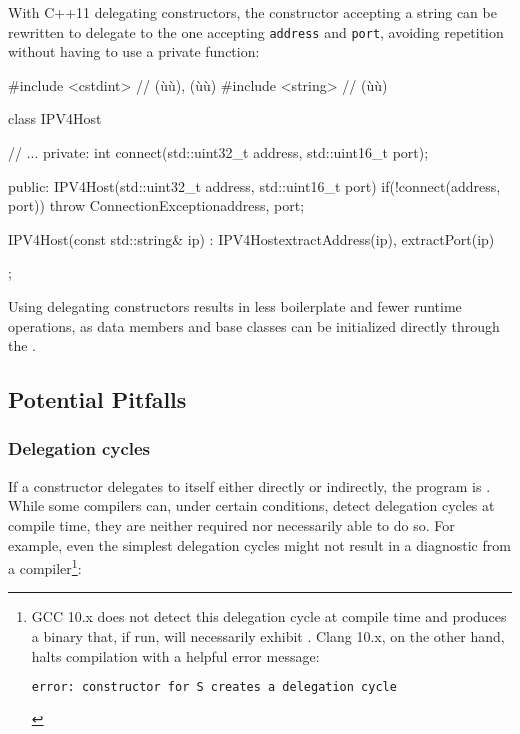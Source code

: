 \noindent With C++11 delegating constructors, the constructor accepting a string can be rewritten to
delegate to the one accepting \lstinline!address! and \lstinline!port!,
avoiding repetition without having to use a private function:

\begin{emcppslisting}[emcppsbatch=e3]
#include <cstdint>  // (ù{}ù), (ù{}ù)
#include <string>   // (ù{}ù)

class IPV4Host
{
     // ...
private:
    int connect(std::uint32_t address, std::uint16_t port);

public:
    IPV4Host(std::uint32_t address, std::uint16_t port)
    {
        if(!connect(address, port))
        {
            throw ConnectionException{address, port};
        }
    }

    IPV4Host(const std::string& ip)
        : IPV4Host{extractAddress(ip), extractPort(ip)}
    {
    }
};
\end{emcppslisting}

\noindent Using delegating constructors results in less boilerplate and fewer runtime
operations, as data members and base classes can be initialized
directly through the .

\subsection[Potential Pitfalls]{Potential Pitfalls}\label{ctordelegrating-potential-pitfalls}

\subsubsection[Delegation cycles]{Delegation cycles}\label{delegation-cycles}

If a constructor delegates to itself either directly or indirectly, the
program is . While some compilers can, under certain conditions, detect delegation cycles at compile time, they are neither
required nor necessarily able to do so. For example, even the simplest delegation cycles might not result in a diagnostic from a compiler{\cprotect\footnote{GCC 10.x does not detect this delegation
cycle at compile time and produces a binary that, if run, will
necessarily exhibit . Clang 10.x, on the
other hand, halts compilation with a helpful error message:

\begin{lstlisting}[language=bash, style=plain, basicstyle={\ttfamily\footnotesize}]
error: constructor for S creates a delegation cycle
\end{lstlisting}\vspace*{-1ex}
      }}:


